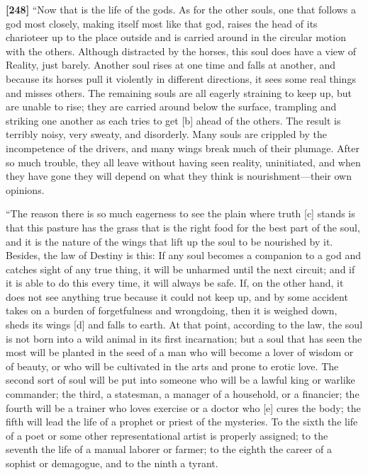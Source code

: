 {\bf {[}248{]}} “Now that is the life of the gods. As for the other
souls, one that follows a god most closely, making itself most like that
god, raises the head of its charioteer up to the place outside and is
carried around in the circular motion with the others. Although
distracted by the horses, this soul does have a view of Reality, just
barely. Another soul rises at one time and falls at another, and because
its horses pull it violently in different directions, it sees some real
things and misses others. The remaining souls are all eagerly straining
to keep up, but are unable to rise; they are carried around below the
surface, trampling and striking one another as each tries to get {[}b{]}
ahead of the others. The result is terribly noisy, very sweaty, and
disorderly. Many souls are crippled by the incompetence of the drivers,
and many wings break much of their plumage. After so much trouble, they
all leave without having seen reality, uninitiated, and when they have
gone they will depend on what they think is nourishment---their own
opinions.

“The reason there is so much eagerness to see the plain where truth
{[}c{]} stands is that this pasture has the grass that is the right food
for the best part of the soul, and it is the nature of the wings that
lift up the soul to be nourished by it. Besides, the law of Destiny is
this: If any soul becomes a companion to a god and catches sight of any
true thing, it will be unharmed until the next circuit; and if it is
able to do this every time, it will always be safe. If, on the other
hand, it does not see anything true because it could not keep up, and by
some accident takes on a burden of forgetfulness and wrongdoing, then it
is weighed down, sheds its wings {[}d{]} and falls to earth. At that
point, according to the law, the soul is not born into a wild animal in
its first incarnation; but a soul that has seen the most will be planted
in the seed of a man who will become a lover of
wisdom or of beauty,
or who will be cultivated in the arts and prone to erotic love. The
second sort of soul will be put into someone who will be a lawful king
or warlike commander; the third, a statesman, a manager of a household,
or a financier; the fourth will be a trainer who loves exercise or a
doctor who {[}e{]} cures the body; the fifth will lead the life of a
prophet or priest of the mysteries. To the sixth the life of a poet or
some other representational artist is properly assigned; to the seventh
the life of a manual laborer or farmer; to the eighth the career of a
sophist or demagogue, and to the ninth a tyrant.


